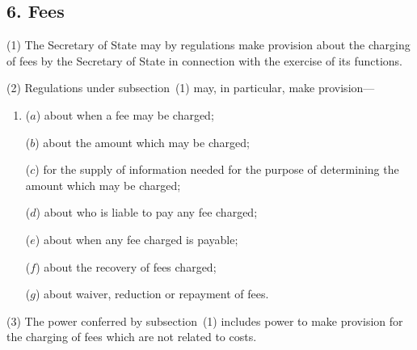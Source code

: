 \documentclass[12pt,a4paper]{article}
\begin{document}
%
%
%
%
%

\subsection{6. Fees}

(1) The Secretary of State may by regulations make provision about the charging of fees by the Secretary of State in connection with the exercise of its functions.

(2) Regulations under subsection~(1) may, in particular, make provision—
\begin{enumerate}\item[]
($a$) about when a fee may be charged;

($b$) about the amount which may be charged;

($c$) for the supply of information needed for the purpose of determining the amount which may be charged;

($d$) about who is liable to pay any fee charged;

($e$) about when any fee charged is payable;

($f$) about the recovery of fees charged;

($g$) about waiver, reduction or repayment of fees.
\end{enumerate}

(3) The power conferred by subsection~(1) includes power to make provision for the charging of fees which are not related to costs.
\end{document}
